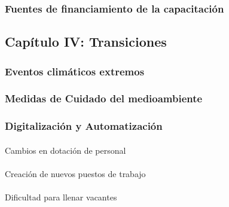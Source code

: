 \documentclass[
  11pt,
]{article}
\makeatletter
\let\oldparagraph\paragraph
\renewcommand{\paragraph}{
    \@ifstar
      \xxxParagraphStar
      \xxxParagraphNoStar
  }
\newcommand{\xxxParagraphStar}[1]{\oldparagraph*{#1}\mbox{}}
\newcommand{\xxxParagraphNoStar}[1]{\oldparagraph{#1}\mbox{}}
\makeatother
\begin{document}
\subsubsection{Fuentes de financiamiento de la
capacitación}\label{fuentes-de-financiamiento-de-la-capacitaciuxf3n}

\subsection{Capítulo IV:
Transiciones}\label{capuxedtulo-iv-transiciones}

\subsubsection{Eventos climáticos
extremos}\label{eventos-climuxe1ticos-extremos}

\subsubsection{Medidas de Cuidado del
medioambiente}\label{medidas-de-cuidado-del-medioambiente}

\subsubsection{Digitalización y
Automatización}\label{digitalizaciuxf3n-y-automatizaciuxf3n}

\paragraph{Cambios en dotación de
personal}\label{cambios-en-dotaciuxf3n-de-personal}

\paragraph{Creación de nuevos puestos de
trabajo}\label{creaciuxf3n-de-nuevos-puestos-de-trabajo}

\paragraph{Dificultad para llenar
vacantes}\label{dificultad-para-llenar-vacantes}
\end{document}
